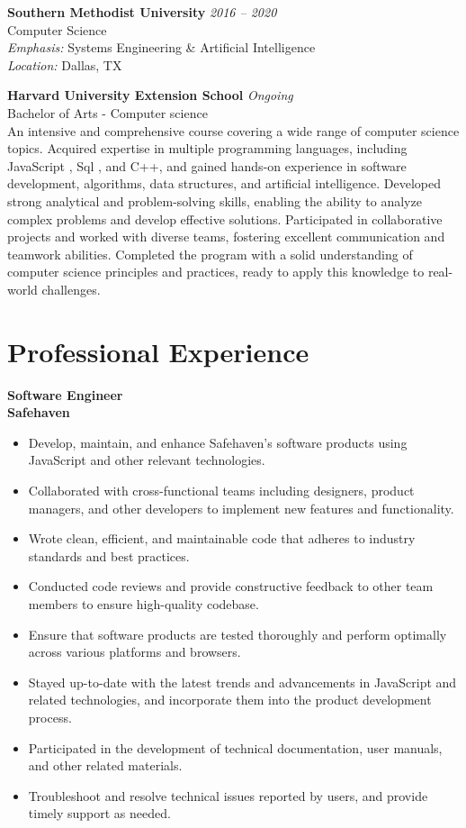 \documentclass[11pt, letterpaper]{article}
\newcommand{\position}[3]{
  \textbf{#1} \hfill \textit{#2} \\
  #3 \vspace{6pt}
}
\newcommand{\education}[4]{
  \textbf{#1} \hfill \textit{#2} \\
  #3 \\
  #4 \vspace{6pt}
}
\begin{document}
\education{Southern Methodist University}{2016 -- 2020}{Computer Science}{
  \textit{Emphasis:} Systems Engineering \& Artificial Intelligence \\
  \textit{Location:} Dallas, TX
}

\education{Harvard University Extension School}{Ongoing}{Bachelor of Arts - Computer science}{
  An intensive and comprehensive course covering a wide range of computer science topics. Acquired expertise in multiple programming languages, including JavaScript , Sql , and C++, and gained hands-on experience in software development, algorithms, data structures, and artificial intelligence. Developed strong analytical and problem-solving skills, enabling the ability to analyze complex problems and develop effective solutions. Participated in collaborative projects and worked with diverse teams, fostering excellent communication and teamwork abilities. Completed the program with a solid understanding of computer science principles and practices, ready to apply this knowledge to real-world challenges.
}

\section{Professional Experience}

\position{Software Engineer}{}{
  \textbf{Safehaven}
  \begin{itemize}[leftmargin=20pt, itemsep=2pt]
    \item Develop, maintain, and enhance Safehaven's software products using JavaScript and other relevant technologies.
    \item Collaborated with cross-functional teams including designers, product managers, and other developers to implement new features and functionality.
    \item Wrote clean, efficient, and maintainable code that adheres to industry standards and best practices.
    \item Conducted code reviews and provide constructive feedback to other team members to ensure high-quality codebase.
    \item Ensure that software products are tested thoroughly and perform optimally across various platforms and browsers.
    \item Stayed up-to-date with the latest trends and advancements in JavaScript and related technologies, and incorporate them into the product development process.
    \item Participated in the development of technical documentation, user manuals, and other related materials.
    \item Troubleshoot and resolve technical issues reported by users, and provide timely support as needed.
  \end{itemize}
}
\end{document}
